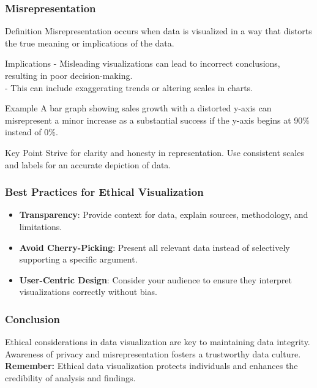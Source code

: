 \documentclass{beamer}
\begin{document}
\begin{frame}[fragile]
    \frametitle{Misrepresentation}
    \begin{block}{Definition}
        Misrepresentation occurs when data is visualized in a way that distorts the true meaning or implications of the data.
    \end{block}
    \begin{block}{Implications}
        - Misleading visualizations can lead to incorrect conclusions, resulting in poor decision-making. \\
        - This can include exaggerating trends or altering scales in charts.
    \end{block}
    \begin{block}{Example}
        A bar graph showing sales growth with a distorted y-axis can misrepresent a minor increase as a substantial success if the y-axis begins at 90\% instead of 0\%.
    \end{block}
    \begin{block}{Key Point}
        Strive for clarity and honesty in representation. Use consistent scales and labels for an accurate depiction of data.
    \end{block}
\end{frame}

\begin{frame}[fragile]
    \frametitle{Best Practices for Ethical Visualization}
    \begin{itemize}
        \item \textbf{Transparency}: Provide context for data, explain sources, methodology, and limitations.
        \item \textbf{Avoid Cherry-Picking}: Present all relevant data instead of selectively supporting a specific argument.
        \item \textbf{User-Centric Design}: Consider your audience to ensure they interpret visualizations correctly without bias.
    \end{itemize}
\end{frame}

\begin{frame}[fragile]
    \frametitle{Conclusion}
    Ethical considerations in data visualization are key to maintaining data integrity. Awareness of privacy and misrepresentation fosters a trustworthy data culture. \\
    \textbf{Remember:} Ethical data visualization protects individuals and enhances the credibility of analysis and findings.
\end{frame}
\end{document}
